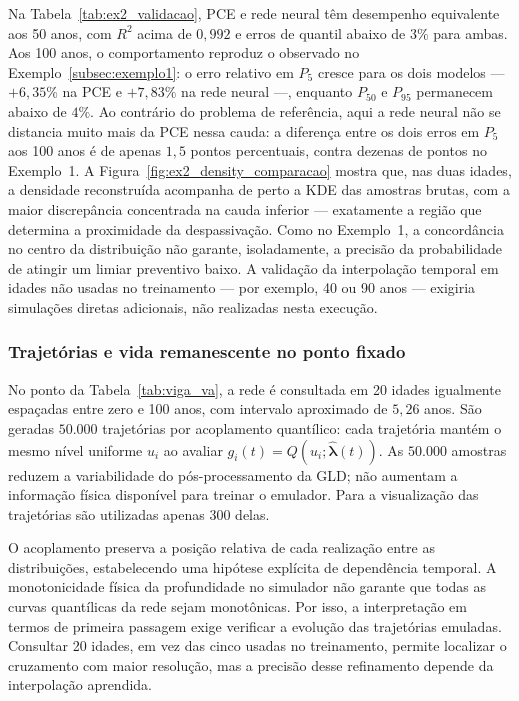 Na Tabela~\ref{tab:ex2_validacao}, PCE e rede neural têm desempenho equivalente aos 50 anos, com $R^2$ acima de $0{,}992$ e erros de quantil abaixo de $3\%$ para ambas. Aos 100 anos, o comportamento reproduz o observado no Exemplo~\ref{subsec:exemplo1}: o erro relativo em $P_5$ cresce para os dois modelos --- $+6{,}35\%$ na PCE e $+7{,}83\%$ na rede neural ---, enquanto $P_{50}$ e $P_{95}$ permanecem abaixo de $4\%$. Ao contrário do problema de referência, aqui a rede neural não se distancia muito mais da PCE nessa cauda: a diferença entre os dois erros em $P_5$ aos 100 anos é de apenas $1{,}5$ pontos percentuais, contra dezenas de pontos no Exemplo~1. A Figura~\ref{fig:ex2_density_comparacao} mostra que, nas duas idades, a densidade reconstruída acompanha de perto a KDE das amostras brutas, com a maior discrepância concentrada na cauda inferior --- exatamente a região que determina a proximidade da despassivação. Como no Exemplo~1, a concordância no centro da distribuição não garante, isoladamente, a precisão da probabilidade de atingir um limiar preventivo baixo. A validação da interpolação temporal em idades não usadas no treinamento --- por exemplo, 40 ou 90 anos --- exigiria simulações diretas adicionais, não realizadas nesta execução.

\subsubsection{Trajetórias e vida remanescente no ponto fixado}

No ponto da Tabela~\ref{tab:viga_va}, a rede é consultada em 20 idades igualmente espaçadas entre zero e 100 anos, com intervalo aproximado de $5{,}26$ anos. São geradas $50.000$ trajetórias por acoplamento quantílico: cada trajetória mantém o mesmo nível uniforme $u_i$ ao avaliar $g_i(t)=Q(u_i;\hat{\boldsymbol{\lambda}}(t))$. As $50.000$ amostras reduzem a variabilidade do pós-processamento da GLD; não aumentam a informação física disponível para treinar o emulador. Para a visualização das trajetórias são utilizadas apenas 300 delas.

O acoplamento preserva a posição relativa de cada realização entre as distribuições, estabelecendo uma hipótese explícita de dependência temporal. A monotonicidade física da profundidade no simulador não garante que todas as curvas quantílicas da rede sejam monotônicas. Por isso, a interpretação em termos de primeira passagem exige verificar a evolução das trajetórias emuladas. Consultar 20 idades, em vez das cinco usadas no treinamento, permite localizar o cruzamento com maior resolução, mas a precisão desse refinamento depende da interpolação aprendida.

